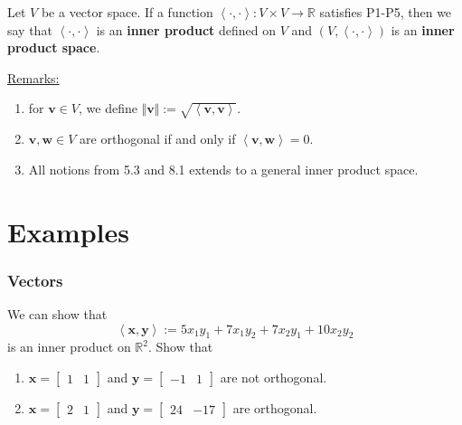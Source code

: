 \documentclass[20pt,a4paper]{extarticle}
\newcommand{\ra}{\rightarrow}
\newcounter{example}
\newcounter{definition}
\begin{document}
\begin{definition}
Let $V$ be a vector space. If a function $\left\langle \cdot , \cdot \right\rangle : V \times V \ra \mathbb{R}$ satisfies P1-P5, then we say that $\left\langle \cdot , \cdot \right\rangle$ is an \textbf{inner product} defined on $V$ and $(V, \left\langle \cdot , \cdot \right\rangle )$ is an \textbf{inner product space}.
\end{definition}


\underline{Remarks:}
	\begin{enumerate}[label=\Circled{\arabic*}]
		\item for $\mathbf{v} \in V$, we define $\Vert \mathbf{v} \Vert := \sqrt{\left\langle \mathbf{v} , \mathbf{v} \right\rangle}$. 
		\item $\mathbf{v} , \mathbf{w} \in V$ are orthogonal if and only if $\left\langle \mathbf{v} , \mathbf{w} \right\rangle = 0$.
		\item All notions from 5.3 and 8.1 extends to a general inner product space.
	\end{enumerate}

\section{Examples}

\subsubsection{Vectors}

\begin{example}
We can show that
	\[
		\left\langle \mathbf{x} , \mathbf{y} \right\rangle :=  5 x_1 y_1 + 7 x_1 y_2 + 7 x_2 y_1 + 10 x_2 y_2 
	\]
is an inner product on $\mathbb{R}^2$. Show that
	\begin{enumerate}[label=\alph*)]
	\item $\mathbf{x} = \begin{bmatrix} 1 & 1 \end{bmatrix}$ and $\mathbf{y} = \begin{bmatrix} -1 & 1 \end{bmatrix}$ are not orthogonal.
	\item $\mathbf{x} = \begin{bmatrix} 2 & 1 \end{bmatrix}$ and $\mathbf{y} = \begin{bmatrix} 24 & -17 \end{bmatrix}$ are orthogonal.
	\end{enumerate}
\end{example}
\begin{solution}

\end{solution}
\end{document}
